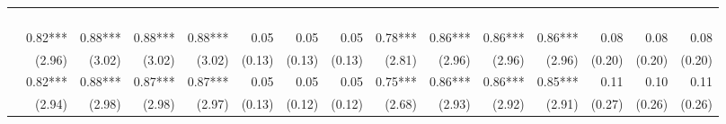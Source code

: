     \begin{tabularx}{1.45\textwidth}{lRRRRRRRRRRRRRR}
        \toprule
        &  &  \\ \cmidrule(rl){2-8} \cmidrule(rl){9-15}
        &  &  &  &  \\
        \cmidrule(rl){2-5} \cmidrule(rl){6-8} \cmidrule(rl){9-12} \cmidrule(rl){13-15}
        &  &  &  &  &  &  &  &  &  &  &  &  &  &  \\
		\midrule
		 \\[\panelspacing]
		 & \num{0.82}***\phantom{)} & \num{0.88}***\phantom{)} & \num{0.88}***\phantom{)} & \num{0.88}***\phantom{)} & \num{0.05}\phantom{***)} & \num{0.05}\phantom{***)} & \num{0.05}\phantom{***)} & \num{0.78}***\phantom{)} & \num{0.86}***\phantom{)} & \num{0.86}***\phantom{)} & \num{0.86}***\phantom{)} & \num{0.08}\phantom{***)} & \num{0.08}\phantom{***)} & \num{0.08}\phantom{***)} \\
		 & (\num{2.96})\phantom{***} & (\num{3.02})\phantom{***} & (\num{3.02})\phantom{***} & (\num{3.02})\phantom{***} & (\num{0.13})\phantom{***} & (\num{0.13})\phantom{***} & (\num{0.13})\phantom{***} & (\num{2.81})\phantom{***} & (\num{2.96})\phantom{***} & (\num{2.96})\phantom{***} & (\num{2.96})\phantom{***} & (\num{0.20})\phantom{***} & (\num{0.20})\phantom{***} & (\num{0.20})\phantom{***} \\ [\dspacing]
		 & \num{0.82}***\phantom{)} & \num{0.88}***\phantom{)} & \num{0.87}***\phantom{)} & \num{0.87}***\phantom{)} & \num{0.05}\phantom{***)} & \num{0.05}\phantom{***)} & \num{0.05}\phantom{***)} & \num{0.75}***\phantom{)} & \num{0.86}***\phantom{)} & \num{0.86}***\phantom{)} & \num{0.85}***\phantom{)} & \num{0.11}\phantom{***)} & \num{0.10}\phantom{***)} & \num{0.11}\phantom{***)} \\
		 & (\num{2.94})\phantom{***} & (\num{2.98})\phantom{***} & (\num{2.98})\phantom{***} & (\num{2.97})\phantom{***} & (\num{0.13})\phantom{***} & (\num{0.12})\phantom{***} & (\num{0.12})\phantom{***} & (\num{2.68})\phantom{***} & (\num{2.93})\phantom{***} & (\num{2.92})\phantom{***} & (\num{2.91})\phantom{***} & (\num{0.27})\phantom{***} & (\num{0.26})\phantom{***} & (\num{0.26})\phantom{***} \\ [\dspacing]

\end{tabularx}
